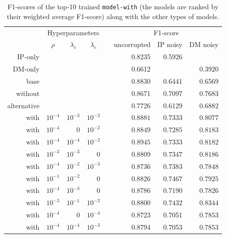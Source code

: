 \begin{table}\centering
{}
\begin{tabular}{@{}rrrrcrrr@{}}\toprule
& \multicolumn{3}{c}{Hyperparameters} & \phantom{abc}& \multicolumn{3}{c}{F1-score}\\
\cmidrule{2-4} \cmidrule{6-8}
& \multicolumn{1}{c}{$\rho$} & \multicolumn{1}{c}{$\lambda_c$} & \multicolumn{1}{c}{$\lambda_e$} && \multicolumn{1}{r}{uncorrupted} & \multicolumn{1}{r}{IP noisy} & \multicolumn{1}{r}{DM noisy}\\ \midrule\midrule
IP-only & & & && 0.8235 & 0.5926 & \\
DM-only & & & && 0.6612 &  & 0.3920\\\midrule
base & & & && 0.8830 & 0.6441 & 0.6569\\
without & & & && 0.8671& 0.7097& 0.7683\\
alternative & & & && 0.7726 & 0.6129 & 0.6882\\\midrule
with & $10^{-4}$ & $10^{-3}$ & $10^{-2}$ && $\mathbf{0.8881}$& $\mathbf{0.7333}$& $\mathbf{0.8077}$\\
with & $10^{-4}$ & $0$ & $10^{-2}$ && $\mathbf{0.8849}$& $\mathbf{0.7285}$& $\mathbf{0.8183}$\\
with & $10^{-4}$ & $10^{-4}$ & $10^{-2}$ && $\mathbf{0.8945}$& $\mathbf{0.7333}$& $\mathbf{0.8182}$\\
with & $10^{-3}$ & $10^{-3}$ & $0$ && 0.8809& $\mathbf{0.7347}$& $\mathbf{0.8186}$\\
with & $10^{-4}$ & $10^{-2}$ & $10^{-3}$ && 0.8736& $\mathbf{0.7383}$& $\mathbf{0.7848}$\\
with & $10^{-1}$ & $10^{-2}$ & $0$ && 0.8826& $\mathbf{0.7467}$& $\mathbf{0.7925}$\\
with & $10^{-4}$ & $10^{-3}$ & $0$ && 0.8786& $\mathbf{0.7190}$& $\mathbf{0.7826}$\\
with & $10^{-3}$ & $10^{-1}$ & $10^{-2}$ && 0.8800& $\mathbf{0.7432}$& $\mathbf{0.8344}$\\
with & $10^{-4}$ & $0$ & $10^{-4}$ && 0.8723& 0.7051& $\mathbf{0.7853}$\\
with & $10^{-4}$ & $10^{-4}$ & $10^{-3}$ && 0.8794& 0.7053& $\mathbf{0.7853}$\\
\bottomrule
\end{tabular}
\caption{F1-scores of the top-10 trained \texttt{model-with} (the models are ranked by their weighted average F1-score) along with the other types of models.}
\label{tab:results}
\end{table}

